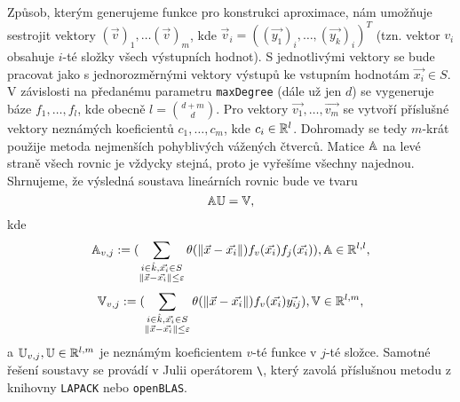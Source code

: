 Způsob, kterým generujeme funkce pro konstrukci aproximace, nám umožňuje sestrojit vektory $(\vec{v})_1, \ldots (\vec{v})_m$, kde $\vec{v}_i = ((\vec{y_1})_i, \ldots, (\vec{y_k})_i)^T$ (tzn. vektor $v_i$ obsahuje $i$-té složky všech výstupních hodnot). S jednotlivými vektory se bude pracovat jako s jednorozměrnými vektory výstupů ke vstupním hodnotám $\vec{x_i} \in S$. V závislosti na předanému parametru \texttt{maxDegree} (dále už jen $d$) se vygeneruje báze $f_1, \ldots, f_l$, kde obecně $l=\binom{d + m}{d}$\cite{asap-mwls}. Pro vektory $\vec{v_1},\ldots,\vec{v_m}$ se vytvoří příslušné vektory neznámých koeficientů $c_1,\ldots,c_m$, kde $c_i \in \mathbb{R}^l$. Dohromady se tedy $m$-krát použije metoda nejmenších pohyblivých vážených čtverců. Matice $\mathbb{A}$ na levé straně všech rovnic je vždycky stejná, proto je vyřešíme všechny najednou. Shrnujeme, že výsledná soustava lineárních rovnic bude ve tvaru
\begin{equation}
  \mathbb{A}\mathbb{U}=\mathbb{V},
\end{equation}
kde
\begin{equation}
  \mathbb{A}_{v,j} := (\sum_{\substack{i \in \hat k, \vec{x_i} \in S\\\|\vec{x}-\vec{x_i}\| \leq \varepsilon}} \theta(\|\vec{x}-\vec{x_i}\|) f_v(\vec{x_i})f_j(\vec{x_i})), \mathbb{A} \in \mathbb{R}^{l,l},
\end{equation}
\begin{equation}
  \mathbb{V}_{v,j} := (\sum_{\substack{i \in \hat k, \vec{x_i} \in S\\\|\vec{x}-\vec{x_i}\| \leq \varepsilon}} \theta(\|\vec{x}-\vec{x_i}\|) f_v(\vec{x_i})\vec{y_{ij}}), \mathbb{V} \in \mathbb{R}^{l,m},
\end{equation}
a $\mathbb{U}_{v,j}, \mathbb{U} \in \mathbb{R}^{l,m}$ je neznámým koeficientem $v$-té funkce v $j$-té složce.
Samotné řešení soustavy se provádí v Julii operátorem \texttt{\textbackslash}, který zavolá příslušnou metodu z knihovny \texttt{LAPACK} nebo \texttt{openBLAS}.

